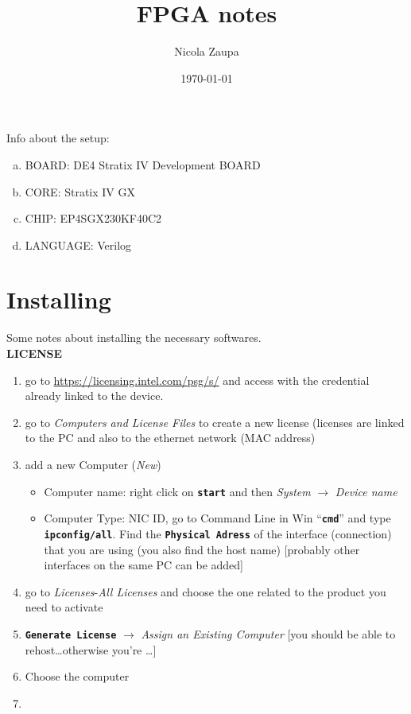 \documentclass[a4paper,10pt,twoside]{article}
\title{\huge \textbf{FPGA notes}}
\author{Nicola Zaupa}
\date{\today}
\newcommand{\0}{\textbf{0}}
\newcommand{\1}{\textbf{1}}
\newcommand{\code}[1]{{\color{Mulberry}\textbf{\texttt{#1}}}}
\begin{document}
    
    \maketitle
    \tableofcontents

    \vfill
    \noindent
    Info about the setup:
    \begin{enumerate}[a.]
        \item BOARD: DE4 Stratix IV Development BOARD
        \item CORE: Stratix IV GX
        \item CHIP: EP4SGX230KF40C2
        \item LANGUAGE: Verilog
    \end{enumerate}

    \newpage



\section{Installing}
    Some notes about installing the necessary softwares.\\


    \noindent\textbf{LICENSE}
    \begin{enumerate}
        \item go to \url{https://licensing.intel.com/psg/s/} and access with the credential already linked to the device.
        \item go to \textit{Computers and License Files} to create a new license (licenses are linked to the PC and also to the ethernet network (MAC address)
        \item add a new Computer (\textit{New})
            \begin{itemize}
                \item Computer name: right click on \code{start} and then \textit{System} $\rightarrow$ \textit{Device name}
                \item Computer Type: NIC ID, go to Command Line in Win ``\code{cmd}'' and type \code{ipconfig/all}. Find the \code{Physical Adress} of the interface (connection) that you are using (you also find the host name) [probably other interfaces on the same PC can be added]
            \end{itemize}
        \item go to \textit{Licenses}-\textit{All Licenses} and choose the one related to the product you need to activate
        \item \code{Generate License} $\rightarrow$ \textit{Assign an Existing Computer} [you should be able to rehost\dots otherwise you're \dots] 
        \item Choose the computer 
        \item 
    \end{enumerate}
\end{document}
